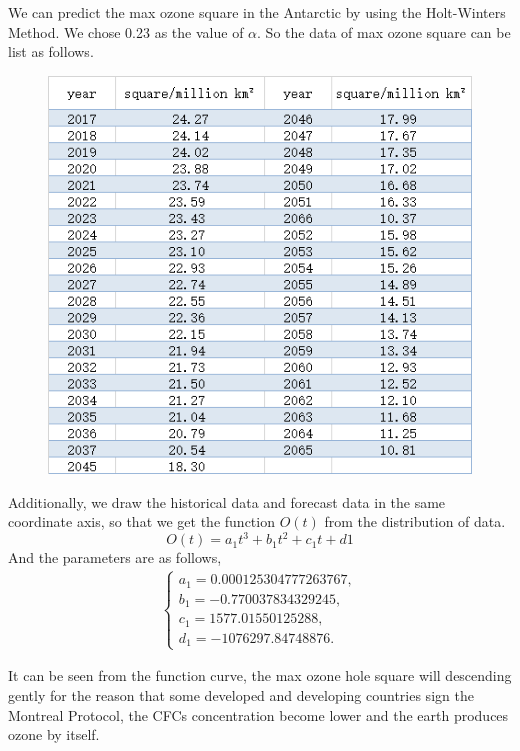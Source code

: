 \documentclass[12pt]{article}
\begin{document}
We can predict the max ozone square in the Antarctic by using the Holt-Winters Method. We chose 0.23 as the value of $\alpha$. So the data of max ozone square can be list as follows.
\begin{center}
\begin{figure}[htpb]
\centering
\includegraphics[scale=0.5]{table}
\caption{}\label{fig:table}
\end{figure}
\end{center}
Additionally, we draw the historical data and forecast data in the same coordinate axis, so that we get the function $O(t)$ from the distribution of data.
$$O(t) = a_1 t^3+b_1 t^2 + c_1 t+d1$$
And the parameters are as follows,
\begin{eqnarray}
\left \{
  \begin{array}{ll}
  a_1 = 0.000125304777263767, \\
  b_1 = -0.770037834329245, \\
  c_1 = 1577.01550125288, \\
  d_1 = -1076297.84748876.
 
\end{array} \right .
\end{eqnarray}

It can be seen from the function curve, the max ozone hole square will descending gently for the reason that some developed and developing countries sign the Montreal Protocol, the CFCs concentration become lower and the earth produces ozone by itself.
\end{document}
